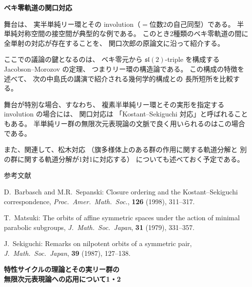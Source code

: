 \documentclass[uplatex,dvipdfmx]{jlreq}
\begin{document}
\newpage

\begin{center}
{\large\bfseries ベキ零軌道の関口対応}\\[6pt]
\hspace*{\fill}{\large\bfseries 落合 啓之（名古屋大学 大学院多元数理科学研究科）}
\end{center}

舞台は、
実半単純リー環とその involution（$=$位数2の自己同型）である。
半単純対称空間の接空間が典型的な例である。
このとき2種類のベキ零軌道の間に全単射の対応が存在することを、
関口次郎の原論文に沿って紹介する。

ここでの議論の鍵となるのは、
ベキ零元から $\mathfrak{sl}(2)$-triple を構成する
Jacobson--Morozov の定理、
つまりリー環の構造論である。
この構成の特徴を述べて、
次の中島氏の講演で紹介される幾何学的構成との
長所短所を比較する。

舞台が特別な場合、すなわち、
複素半単純リー環とその実形を指定する involution の場合には、
関口対応は
「Kostant--Sekiguchi 対応」と呼ばれることもある。
半単純リー群の無限次元表現論の文脈で良く用いられるのはこの場合である。

また、関連して、松木対応
（旗多様体上のある群の作用に関する軌道分解と
別の群に関する軌道分解が1対1に対応する）
についても述べておく予定である。

\begin{center}\textsc{参考文献}\end{center}
\begin{enumerate}[{[1]}]
  \item D.~Barbasch and M.R.~Sepanski:
    Closure ordering and the Kostant--Sekiguchi correspondence,
    \textit{Proc.\ Amer.\ Math.\ Soc.}, \textbf{126} (1998), 311--317.
  \item T.~Matsuki:
    The orbits of affine symmetric spaces under the action
    of minimal parabolic subgroups,
    \textit{J.\ Math.\ Soc.\ Japan}, \textbf{31} (1979), 331--357.
  \item J.~Sekiguchi:
    Remarks on nilpotent orbits of a symmetric pair,
    \textit{J.\ Math.\ Soc.\ Japan}, \textbf{39} (1987), 127--138.
\end{enumerate}

\newpage

\begin{center}
{\large\bfseries 特性サイクルの理論とその実リー群の\\
無限次元表現論への応用について1・2}\\[6pt]
\hspace*{\fill}{\large\bfseries 竹内 潔（筑波大学 数学系）}
\end{center}
\end{document}

